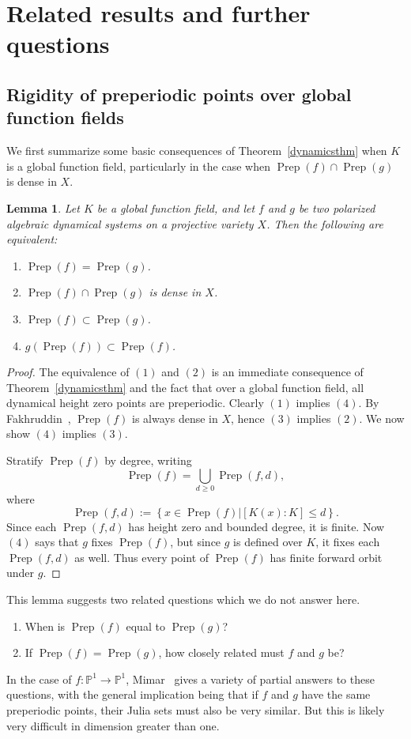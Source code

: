 \documentclass[times, doublespace]{amsart}
\numberwithin{equation}{section}
\theoremstyle{plain}
\newtheorem{lemma}[equation]{Lemma}
\theoremstyle{definition}
\DeclareMathOperator{\Prep}{Prep}
\renewcommand{\P}{\mathbb{P}}
\begin{document}
\section{Related results and further questions}\label{future}

\subsection{Rigidity of preperiodic points over global function fields}
We first summarize some basic consequences of Theorem~\ref{dynamicsthm} when $K$ is a global function field, particularly in the case when $\Prep(f)\cap\Prep(g)$ is dense in $X$.

\begin{lemma}
Let $K$ be a global function field, and let $f$ and $g$ be two polarized algebraic dynamical systems on a projective variety $X$. Then the following are equivalent:
\begin{enumerate}
\item
$\Prep(f)=\Prep(g)$.
\item
$\Prep(f)\cap\Prep(g)$ is dense in $X$.
\item
$\Prep(f)\subset\Prep(g)$.
\item
$g(\Prep(f))\subset \Prep(f)$.
\end{enumerate}
\end{lemma}

\begin{proof}
The equivalence of $(1)$ and $(2)$ is an immediate consequence of Theorem~\ref{dynamicsthm} and the fact that over a global function field, all dynamical height zero points are preperiodic. Clearly $(1)$ implies $(4)$. By Fakhruddin~\cite{Fakhruddin}, $\Prep(f)$ is always dense in $X$, hence $(3)$ implies $(2)$. We now show $(4)$ implies $(3)$.

Stratify $\Prep(f)$ by degree, writing
\[ \Prep(f)=\bigcup_{d\ge0}\Prep(f,d),\]
where
\[ \Prep(f,d):=\left\{x\in\Prep(f)|[K(x):K]\le d\right\}.\]
Since each $\Prep(f,d)$ has height zero and bounded degree, it is finite. Now $(4)$ says that $g$ fixes $\Prep(f)$, but since $g$ is defined over $K$, it fixes each $\Prep(f,d)$ as well. Thus every point of $\Prep(f)$ has finite forward orbit under $g$.
\end{proof}

This lemma suggests two related questions which we do not answer here.
\begin{enumerate}
\item
When is $\Prep(f)$ equal to $\Prep(g)$?
\item
If $\Prep(f)=\Prep(g)$, how closely related must $f$ and $g$ be?
\end{enumerate}
In the case of $f:\P^1\to\P^1$, Mimar~\cite{mimar} gives a variety of partial answers to these questions, with the general implication being that if $f$ and $g$ have the same preperiodic points, their Julia sets must also be very similar. But this is likely very difficult in dimension greater than one.
\end{document}
